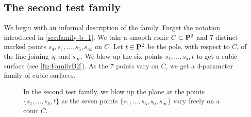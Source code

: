 \documentclass[12pt,reqno]{amsart}
\numberwithin{equation}{section}
\begin{document}

\subsection{The second test family}
\label{sec:family-b_2}
We begin with an informal description of the family.
Forget the notation introduced in \autoref{sec:family-b_1}.
We take a smooth conic $C \subset \P^2$ and 7 distinct marked points $s_0, s_1, \dots, s_5, s_\infty$ on $C$.
Let $t \in \P^2$ be the pole, with respect to $C$, of the line joining $s_0$ and $s_\infty$.
We blow up the six points $s_1,\dots, s_5, t$ to get a cubic surface (see \autoref{fig:FamilyB2}).
As the 7 points vary on $C$, we get a 4-parameter family of cubic surfaces.

\begin{figure}
    \centering
    
    \caption{
      In the second test family, we blow up the plane at the points $\{s_{1}, \dots, s_{5}, t\}$ as the seven points $\{s_1, \dots, s_5, s_0, s_\infty\}$ vary freely on a conic $C$.}
    \label{fig:FamilyB2}
  \end{figure}
\end{document}
